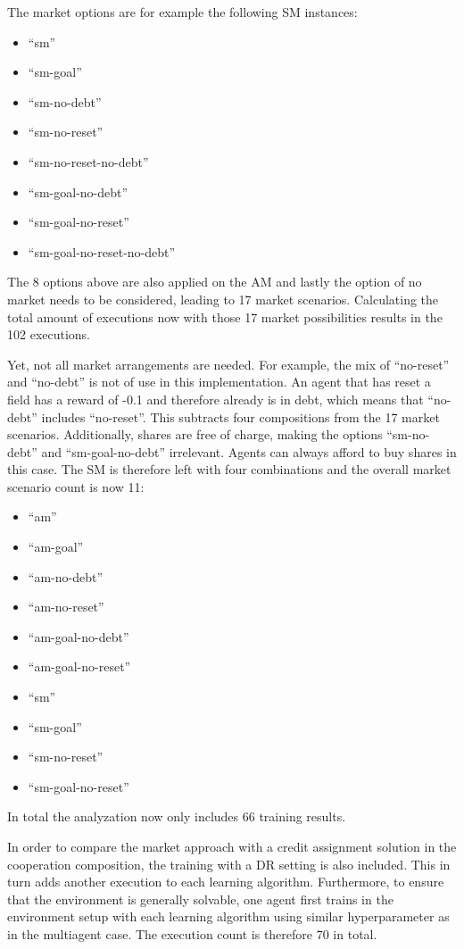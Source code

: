 The market options are for example the following SM instances: 
\begin{itemize}
    \item ``sm''
    \item ``sm-goal''
    \item ``sm-no-debt''
    \item ``sm-no-reset''
    \item ``sm-no-reset-no-debt''
    \item ``sm-goal-no-debt''
    \item ``sm-goal-no-reset''
    \item ``sm-goal-no-reset-no-debt''
\end{itemize}
The 8 options above are also applied on the AM and lastly the option of no market needs to be considered, leading to 17 market scenarios. Calculating the total amount of executions now with those 17 market possibilities results in the 102 executions.

Yet, not all market arrangements are needed. For example, the mix of ``no-reset'' and ``no-debt'' is not of use in this implementation. An agent that has reset a field has a reward of -0.1 and therefore already is in debt, which means that ``no-debt'' includes ``no-reset''. This subtracts four compositions from the 17 market scenarios. Additionally, shares are free of charge, making the options ``sm-no-debt'' and ``sm-goal-no-debt'' irrelevant. Agents can always afford to buy shares in this case. The SM is therefore left with four combinations and the overall market scenario count is now 11:
\begin{itemize}
    \item ``am''
    \item ``am-goal''
    \item ``am-no-debt''
    \item ``am-no-reset''
    \item ``am-goal-no-debt''
    \item ``am-goal-no-reset''
    \item ``sm''
    \item ``sm-goal''
    \item ``sm-no-reset''
    \item ``sm-goal-no-reset''
\end{itemize}
In total the analyzation now only includes 66 training results. 

In order to compare the market approach with a credit assignment solution in the cooperation composition, the training with a DR setting is also included. This in turn adds another execution to each learning algorithm. Furthermore, to ensure that the environment is generally solvable, one agent first trains in the environment setup with each learning algorithm using similar hyperparameter as in the multiagent case. The execution count is therefore 70 in total.

